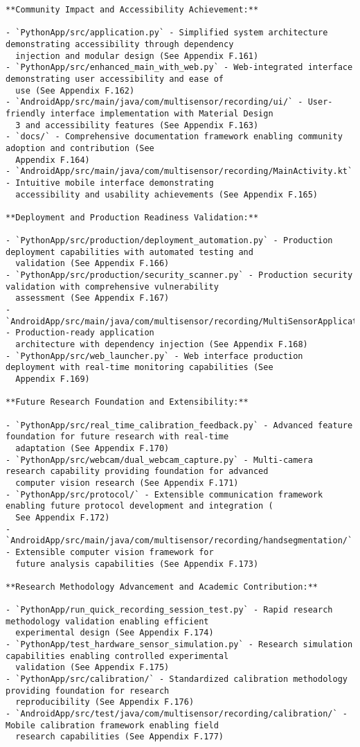 \documentclass[12pt,a4paper]{report}
\begin{document}
\begin{verbatim}
**Community Impact and Accessibility Achievement:**

- `PythonApp/src/application.py` - Simplified system architecture demonstrating accessibility through dependency
  injection and modular design (See Appendix F.161)
- `PythonApp/src/enhanced_main_with_web.py` - Web-integrated interface demonstrating user accessibility and ease of
  use (See Appendix F.162)
- `AndroidApp/src/main/java/com/multisensor/recording/ui/` - User-friendly interface implementation with Material Design
  3 and accessibility features (See Appendix F.163)
- `docs/` - Comprehensive documentation framework enabling community adoption and contribution (See
  Appendix F.164)
- `AndroidApp/src/main/java/com/multisensor/recording/MainActivity.kt` - Intuitive mobile interface demonstrating
  accessibility and usability achievements (See Appendix F.165)

**Deployment and Production Readiness Validation:**

- `PythonApp/src/production/deployment_automation.py` - Production deployment capabilities with automated testing and
  validation (See Appendix F.166)
- `PythonApp/src/production/security_scanner.py` - Production security validation with comprehensive vulnerability
  assessment (See Appendix F.167)
- `AndroidApp/src/main/java/com/multisensor/recording/MultiSensorApplication.kt` - Production-ready application
  architecture with dependency injection (See Appendix F.168)
- `PythonApp/src/web_launcher.py` - Web interface production deployment with real-time monitoring capabilities (See
  Appendix F.169)

**Future Research Foundation and Extensibility:**

- `PythonApp/src/real_time_calibration_feedback.py` - Advanced feature foundation for future research with real-time
  adaptation (See Appendix F.170)
- `PythonApp/src/webcam/dual_webcam_capture.py` - Multi-camera research capability providing foundation for advanced
  computer vision research (See Appendix F.171)
- `PythonApp/src/protocol/` - Extensible communication framework enabling future protocol development and integration (
  See Appendix F.172)
- `AndroidApp/src/main/java/com/multisensor/recording/handsegmentation/` - Extensible computer vision framework for
  future analysis capabilities (See Appendix F.173)

**Research Methodology Advancement and Academic Contribution:**

- `PythonApp/run_quick_recording_session_test.py` - Rapid research methodology validation enabling efficient
  experimental design (See Appendix F.174)
- `PythonApp/test_hardware_sensor_simulation.py` - Research simulation capabilities enabling controlled experimental
  validation (See Appendix F.175)
- `PythonApp/src/calibration/` - Standardized calibration methodology providing foundation for research
  reproducibility (See Appendix F.176)
- `AndroidApp/src/test/java/com/multisensor/recording/calibration/` - Mobile calibration framework enabling field
  research capabilities (See Appendix F.177)


\end{verbatim}
\end{document}
